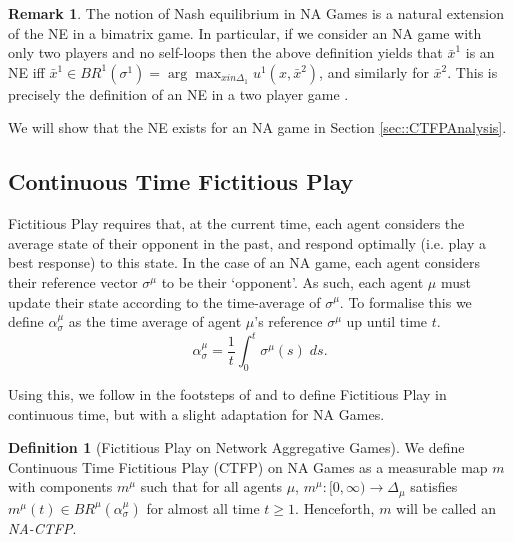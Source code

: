 \documentclass{article}
\theoremstyle{definition}
\newtheorem{definition}{Definition}
\newtheorem*{remark}{Remark}
\newcommand{\agentset}{\mathcal{N}}
\newcommand{\wmunu}{w^{\mu \nu}}
\newcommand{\xmu}{x^{\mu}}
\newcommand{\xnu}{x^{\nu}}
\newcommand{\refmu}{\sigma^{\mu}}
\newcommand{\avgref}[1]{\alpha_\sigma^{#1}}
\newcommand{\NE}[1]{\bar{x}^{#1}}
\newcommand{\weightedsum}{ \sum_{\nu \in N^\mu} \wmunu \xnu}
\begin{document}
\begin{remark}
	The notion of Nash equilibrium in NA Games is a natural
	extension of the NE in a bimatrix game.
	In particular, if we consider an NA game with only two players and no
	self-loops then the above definition yields that $ \NE{1}$ is an NE iff
	$     \NE{1} \in BR^1 (\sigma^1) = \arg \max_{x in \Delta_1} u^1 (x, \NE{2})$,
	and similarly for $\NE{2}$. This is precisely the definition of an NE in a two player game \cite{}.
\end{remark}

We will show that the NE exists for an NA game in Section \ref{sec::CTFPAnalysis}. 

%

\subsection{Continuous Time Fictitious Play}
\label{sec::CTFP}

  Fictitious Play requires that, at the current time, each agent
  considers the average state of their opponent in the past, and
  respond optimally (i.e. play a best response) to this state. In the
  case of an NA game, each agent considers their reference vector $\refmu$ to
  be their `opponent'. As such, each agent $\mu$ must update their state
  according to the time-average of $\refmu$. To formalise this we
  define $\avgref{\mu}$ as the time average of agent $\mu$'s reference
  $\refmu$ up until time $t$.
  \begin{equation}
    \avgref{\mu} = \frac{1}{t} \int_0^t \refmu(s) \; ds.
  \end{equation}

  Using this, we follow in the footsteps of  \cite{Ewerhart2020} and \cite{Harris1998} to define
  Fictitious Play in continuous time, but with a slight adaptation for NA Games.
%
  \begin{definition}[Fictitious Play on Network Aggregative Games] \label{def::NACTFP}
    We define Continuous Time Fictitious Play (CTFP) on NA Games as a measurable map $m$ with components $m^\mu$ such that for all agents $\mu$, $m^\mu: [0, \infty) \rightarrow \Delta_\mu$ satisfies $m^\mu(t) \in
    BR^\mu(\alpha_{\sigma}^\mu)$ for almost all time $t \geq 1$. Henceforth, $m$ will be called an \emph{NA-CTFP}.
  \end{definition}
\end{document}
